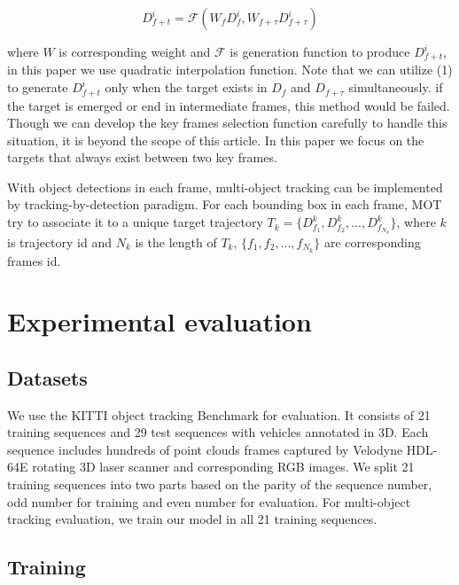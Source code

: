\documentclass{bmvc2k}
\begin{document}
\begin{equation}
D^i_{f+t} = \mathcal{F}(W_f D^i_f, W_{f+\tau} D^i_{f+\tau})
\end{equation}

where $W$ is corresponding weight and $\mathcal{F}$ is generation function to produce $D^i_{f+t}$, in this paper we use quadratic interpolation function. Note that we can utilize (1) to generate $D^i_{f+t}$ only when the target exists in $D_f$ and $D_{f+\tau}$ simultaneously. if the target is emerged or end in intermediate frames, this method would be failed. Though we can develop the key frames selection function carefully to handle this situation, it is beyond the scope of this article. In this paper we focus on the targets that always exist between two key frames.

With object detections in each frame, multi-object tracking can be implemented by tracking-by-detection paradigm. For each bounding box in each frame, MOT try to associate it to a unique target trajectory $T_k = \{D^k_{f_1}, D^k_{f_2}, ..., D^k_{f_{N_k}}\}$, where $k$ is trajectory id and $N_k$ is the length of $T_k$, $\{f_1, f_2, ..., f_{N_k}\}$ are corresponding frames id.

\section{Experimental evaluation}
\label{sec:experiments}

\subsection{Datasets}
We use the KITTI object tracking Benchmark \cite{geiger2013vision} for evaluation. It consists of 21 training sequences and 29 test sequences with vehicles annotated in 3D. Each sequence includes hundreds of point clouds frames captured by Velodyne HDL-64E rotating 3D laser scanner and corresponding RGB images. We split 21 training sequences into two parts based on the parity of the sequence number, odd number for training and even number for evaluation. For multi-object tracking evaluation, we train our model in all 21 training sequences.

\subsection{Training}
\end{document}
